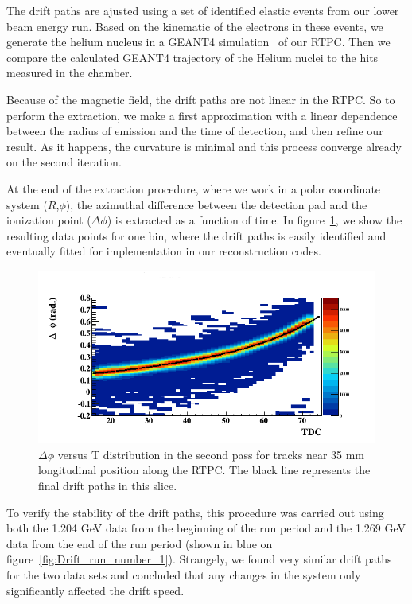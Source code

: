 \documentclass[twocolumn,showpacs,superscriptaddress,groupedaddress]{revtex4}
\begin{document}
The drift paths are ajusted using a set of identified elastic events 
from our lower beam energy run. Based on the kinematic of the electrons in
these events, we generate the helium nucleus in a GEANT4 
simulation~\cite{GEANT4} of our RTPC. Then we compare the calculated GEANT4 trajectory of 
the Helium nuclei to the hits measured in the chamber. 

Because of the 
magnetic field, the drift paths are not linear in the RTPC. So to perform the extraction, 
we make a first approximation with a linear dependence between the radius of 
emission and the time of detection, and then refine our result. As it happens, 
the curvature is minimal and this process converge already on the second 
iteration. 

At the end of the extraction procedure, where we work in a polar coordinate 
system ($R$,$\phi$), the azimuthal difference between the detection pad and 
the ionization point ($\Delta\phi$) is extracted as a function of time. 
In figure~\ref{fig:DELTA_PHI_TDC}, we show the resulting data points for one 
bin, where the drift paths is easily identified and eventually fitted for 
implementation in our reconstruction codes.

\begin{figure}[tb]
\centering
\includegraphics[scale=0.37]{fig/FitResult_p2_10.png}
\caption{$\Delta \phi$ versus T distribution in the second pass for tracks
near 35 mm longitudinal position along the RTPC. The black line represents 
the final drift paths in this slice.}
\label{fig:DELTA_PHI_TDC}
\end{figure}

To verify the stability of the drift paths, this procedure was carried out 
using both the 1.204 GeV data from the beginning of the run period and the 
1.269 GeV data from the end of the run period (shown in blue on 
figure~\ref{fig:Drift_run_number_1}). Strangely, we found very similar drift paths
for the two data sets and concluded that any changes in the system only
significantly affected the drift speed.
\end{document}
